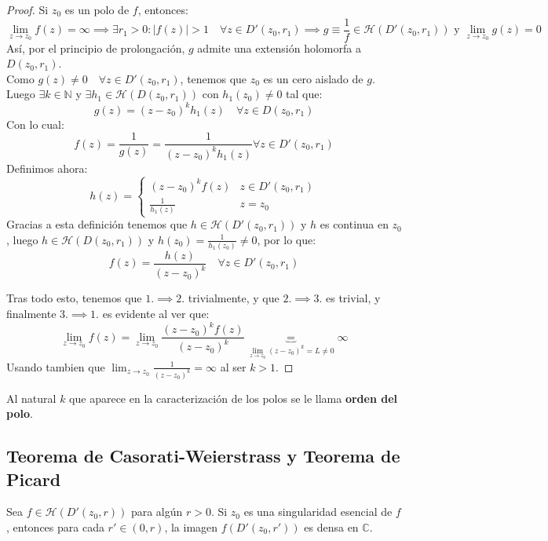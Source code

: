 \begin{proof}
    Si $z_0$ es un polo de $f$, entonces:
    \[
    \lim_{z \to z_0} f(z) = \infty \implies 
    \exists r_1 > 0 : |f(z)| > 1 \quad \forall z \in D'(z_0, r_1) \implies
    g \equiv \frac{1}{f} \in \mathcal{H}(D'(z_0, r_1)) \text{ y } \lim_{z \to z_0} g(z) = 0
    \]
    Así, por el principio de prolongación, $g$ admite una extensión holomorfa a $D(z_0, r_1)$.\\
    Como $g(z) \neq 0 \quad \forall z \in D'(z_0, r_1)$, tenemos que $z_0$ es un cero aislado de $g$.\\
    Luego $\exists k \in \mathbb{N}$ y $\exists h_1 \in \mathcal{H}(D(z_0, r_1))$ con $h_1(z_0) \neq 0$ tal que:
    \[
    g(z) = (z-z_0)^k h_1(z) \quad \forall z \in D(z_0, r_1)
    \]
    Con lo cual:
    \[
    f(z) = 
    \frac{1}{g(z)} = 
    \frac{1}{(z-z_0)^k h_1(z)} \forall z \in D'(z_0, r_1)
    \]
    Definimos ahora:
    \[
    h(z) =
    \begin{cases}
        (z-z_0)^k f(z) & z \in D'(z_0, r_1)\\
        \frac{1}{h_1(z)} & z = z_0
    \end{cases}
    \]
    Gracias a esta definición tenemos que $h \in \mathcal{H}(D'(z_0, r_1))$ y $h$ es continua en $z_0$, luego $h \in \mathcal{H}(D(z_0, r_1))$ y $h(z_0) = \frac{1}{h_1(z_0)} \neq 0$, por lo que:
    \[
    f(z) =
    \frac{h(z)}{(z-z_0)^k} \quad \forall z \in D'(z_0, r_1)
    \]

    Tras todo esto, tenemos que $1. \implies 2.$ trivialmente, y que $2. \implies 3.$ es trivial, y finalmente $3. \implies 1.$ es evidente al ver que:
    \[
    \lim_{z \to z_0} f(z) = 
    \lim_{z \to z_0} \frac{(z-z_0)^k f(z)}{(z-z_0)^k} \underbrace{=}_{\lim_{z \to z_0} (z-z_0)^k = L \neq 0} \infty
    \]
    Usando tambien que $\lim_{z \to z_0} \frac{1}{(z-z_0)^k} = \infty$ al ser $k > 1$.
\end{proof}

\begin{definición}
    Al natural $k$ que aparece en la caracterización de los polos se le llama \textbf{orden del polo}.
\end{definición}

\subsection{Teorema de Casorati-Weierstrass y Teorema de Picard}

\begin{teorema}
    Sea $f \in \mathcal{H}(D'(z_0, r))$ para algún $r > 0$. Si $z_0$ es una singularidad esencial de $f$, entonces para cada $r' \in (0, r)$, la imagen $f(D'(z_0, r'))$ es densa en $\mathbb{C}$.
\end{teorema}


